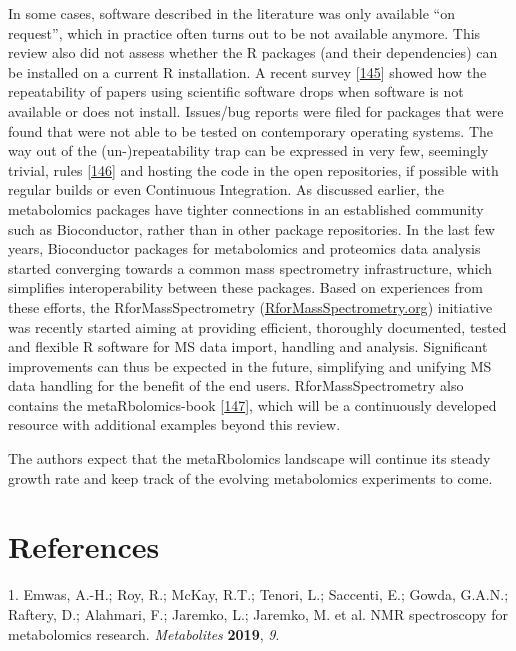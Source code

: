 \documentclass[]{article}
\begin{document}
In some cases, software described in the literature was only available ``on request'', which in practice often turns out to be not available anymore. This review also did not assess whether the R packages (and their dependencies) can be installed on a current R installation. A recent survey {[}\protect\hyperlink{ref-collberg_2016}{145}{]} showed how the repeatability of papers using scientific software drops when software is not available or does not install. Issues/bug reports were filed for packages that were found that were not able to be tested on contemporary operating systems. The way out of the (un-)repeatability trap can be expressed in very few, seemingly trivial, rules {[}\protect\hyperlink{ref-taschuk_2017}{146}{]} and hosting the code in the open repositories, if possible with regular builds or even Continuous Integration. As discussed earlier, the metabolomics packages have tighter connections in an established community such as Bioconductor, rather than in other package repositories. In the last few years, Bioconductor packages for metabolomics and proteomics data analysis started converging towards a common mass spectrometry infrastructure, which simplifies interoperability between these packages. Based on experiences from these efforts, the RforMassSpectrometry (\href{https://rformassspectrometry.org}{RforMassSpectrometry.org}) initiative was recently started aiming at providing efficient, thoroughly documented, tested and flexible R software for MS data import, handling and analysis. Significant improvements can thus be expected in the future, simplifying and unifying MS data handling for the benefit of the end users. RforMassSpectrometry also contains the metaRbolomics-book {[}\protect\hyperlink{ref-stanstrup_website_nd}{147}{]}, which will be a continuously developed resource with additional examples beyond this review.

The authors expect that the metaRbolomics landscape will continue its steady growth rate and keep track of the evolving metabolomics experiments to come.

\newpage

\hypertarget{references}{%
\section*{References}\label{references}}

\hypertarget{refs}{}
\leavevmode\hypertarget{ref-emwas_2019}{}%
1. Emwas, A.-H.; Roy, R.; McKay, R.T.; Tenori, L.; Saccenti, E.; Gowda, G.A.N.; Raftery, D.; Alahmari, F.; Jaremko, L.; Jaremko, M. et al. NMR spectroscopy for metabolomics research. \emph{Metabolites} \textbf{2019}, \emph{9}.
\end{document}
